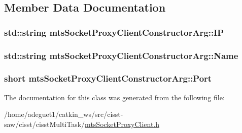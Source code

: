 \subsection{Member Data Documentation}
\hypertarget{classmts_socket_proxy_client_constructor_arg_a86c3db84d1fd5663615915a4aa455845}{
\subsubsection[{I\-P}]{\setlength{\rightskip}{0pt plus 5cm}std\-::string mts\-Socket\-Proxy\-Client\-Constructor\-Arg\-::\-I\-P}}\label{classmts_socket_proxy_client_constructor_arg_a86c3db84d1fd5663615915a4aa455845}
\hypertarget{classmts_socket_proxy_client_constructor_arg_a750e2b218eac14034166d2c4614cd2bf}{
\subsubsection[{Name}]{\setlength{\rightskip}{0pt plus 5cm}std\-::string mts\-Socket\-Proxy\-Client\-Constructor\-Arg\-::\-Name}}\label{classmts_socket_proxy_client_constructor_arg_a750e2b218eac14034166d2c4614cd2bf}
\hypertarget{classmts_socket_proxy_client_constructor_arg_ab036fe588319de186ec63d6cf4900bc7}{
\subsubsection[{Port}]{\setlength{\rightskip}{0pt plus 5cm}short mts\-Socket\-Proxy\-Client\-Constructor\-Arg\-::\-Port}}\label{classmts_socket_proxy_client_constructor_arg_ab036fe588319de186ec63d6cf4900bc7}


The documentation for this class was generated from the following file\-:\begin{DoxyCompactItemize}
\item 
/home/adeguet1/catkin\-\_\-ws/src/cisst-\/saw/cisst/cisst\-Multi\-Task/\hyperlink{mts_socket_proxy_client_8h}{mts\-Socket\-Proxy\-Client.\-h}\end{DoxyCompactItemize}
